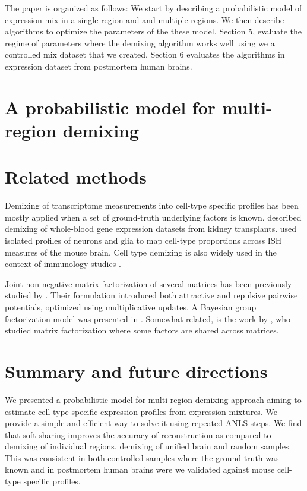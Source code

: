 \documentclass{article} %
\begin{document}
The paper is organized as follows: We start by describing a probabilistic model of expression mix in a single region and and multiple regions. We then describe algorithms to optimize the parameters of the these model. Section 5, evaluate the regime of parameters where the demixing algorithm works well using we a controlled mix dataset that we created. Section 6 evaluates the algorithms in expression dataset from postmortem human brains.

\section{A probabilistic model for multi-region demixing}


\section{Related methods}
Demixing of transcriptome measurements into cell-type specific profiles has been mostly applied when a set of ground-truth underlying factors is known. \citet{shen2010cell} described demixing of 
whole-blood gene expression datasets from kidney transplants. \citet{grange2014cell} used isolated profiles of neurons and glia \cite{okaty2011cell} to map cell-type proportions across ISH measures of the mouse brain. Cell type demixing is also widely used in the context of immunology studies \cite{shen2013computational}.

Joint non negative matrix factorization of several matrices has been previously studied by \citet{lee2009group}. Their formulation introduced  both attractive and repulsive pairwise potentials, optimized using multiplicative updates. A Bayesian group factorization model was presented in \citet{shin2012bayesian}. Somewhat related, is the work by \citet{wang2012group}, who studied matrix factorization where some factors are shared across matrices.






\section{Summary and future directions}
We presented a probabilistic model for multi-region demixing approach aiming to estimate cell-type specific expression profiles from expression mixtures. We provide a simple and efficient way to solve it using repeated ANLS steps. We find that soft-sharing improves the accuracy of reconstruction as compared to demixing of individual regions, demixing of unified brain and random samples. This was consistent in both controlled samples where the ground truth was known and in postmortem human brains were we validated against mouse cell-type specific profiles.
\end{document}

